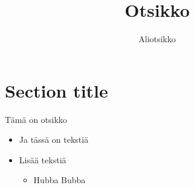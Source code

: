 \documentclass[aspectratio=1610,14pt]{beamer}
\title{Otsikko}
\subtitle{Aliotsikko}
\begin{document}
    \section{Section title}

    \begin{frame}{Tämä on otsikko}
      \begin{itemize}
      \item Ja tässä on tekstiä
      \item Lisää tekstiä
        \begin{itemize}
        \item Hubba Bubba
        \end{itemize}
      \end{itemize}
    \end{frame}
\end{document}

